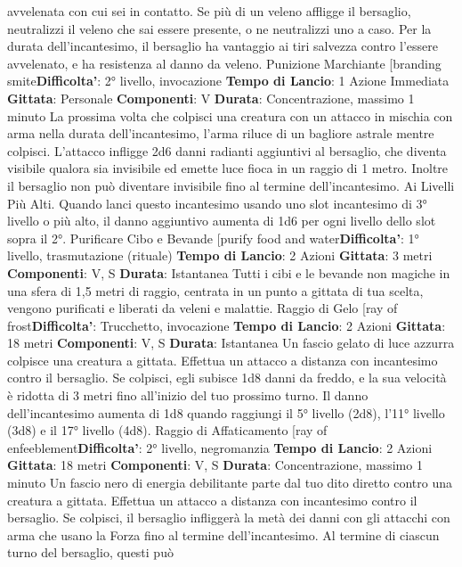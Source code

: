 \begin{multicols}{2}
avvelenata con cui sei in contatto. Se più di un veleno
affligge il bersaglio, neutralizzi il veleno che sai essere
presente, o ne neutralizzi uno a caso.
Per la durata dell’incantesimo, il bersaglio ha vantaggio
ai tiri salvezza contro l’essere avvelenato, e ha
resistenza al danno da veleno.
Punizione Marchiante
[branding smite\textbf{Difficolta'}:
2° livello, invocazione
\textbf{Tempo di Lancio}: 1 Azione Immediata
\textbf{Gittata}: Personale
\textbf{Componenti}: V
\textbf{Durata}: Concentrazione, massimo 1 minuto
La prossima volta che colpisci una creatura con un
attacco in mischia con arma nella durata
dell’incantesimo, l’arma riluce di un bagliore astrale
mentre colpisci. L’attacco infligge 2d6 danni radianti
aggiuntivi al bersaglio, che diventa visibile qualora sia
invisibile ed emette luce fioca in un raggio di 1 metro.
Inoltre il bersaglio non può diventare invisibile fino al
termine dell’incantesimo.
Ai Livelli Più Alti. Quando lanci questo incantesimo
usando uno slot incantesimo di 3° livello o più alto, il
danno aggiuntivo aumenta di 1d6 per ogni livello dello
slot sopra il 2°.
Purificare Cibo e Bevande
[purify food and water\textbf{Difficolta'}:
1° livello, trasmutazione (rituale)
\textbf{Tempo di Lancio}: 2 Azioni
\textbf{Gittata}: 3 metri
\textbf{Componenti}: V, S
\textbf{Durata}: Istantanea
Tutti i cibi e le bevande non magiche in una sfera di 1,5
metri di raggio, centrata in un punto a gittata di tua
scelta, vengono purificati e liberati da veleni e malattie.
Raggio di Gelo
[ray of frost\textbf{Difficolta'}:
Trucchetto, invocazione
\textbf{Tempo di Lancio}: 2 Azioni
\textbf{Gittata}: 18 metri
\textbf{Componenti}: V, S
\textbf{Durata}: Istantanea
Un fascio gelato di luce azzurra colpisce una creatura a
gittata. Effettua un attacco a distanza con incantesimo
contro il bersaglio. Se colpisci, egli subisce 1d8 danni
da freddo, e la sua velocità è ridotta di 3 metri fino
all’inizio del tuo prossimo turno.
Il danno dell’incantesimo aumenta di 1d8 quando
raggiungi il 5° livello (2d8), l’11° livello (3d8) e il 17°
livello (4d8).
Raggio di Affaticamento
[ray of enfeeblement\textbf{Difficolta'}:
2° livello, negromanzia
\textbf{Tempo di Lancio}: 2 Azioni
\textbf{Gittata}: 18 metri
\textbf{Componenti}: V, S
\textbf{Durata}: Concentrazione, massimo 1 minuto
Un fascio nero di energia debilitante parte dal tuo dito
diretto contro una creatura a gittata. Effettua un attacco
a distanza con incantesimo contro il bersaglio. Se
colpisci, il bersaglio infliggerà la metà dei danni con gli
attacchi con arma che usano la Forza fino al termine
dell’incantesimo.
Al termine di ciascun turno del bersaglio, questi può

\end{multicols}
